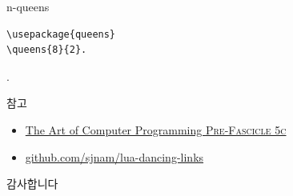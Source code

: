 \documentclass{beamer}
\begin{document}
%
\begin{frame}[fragile]{n-queens}
\begin{verbatim}
\usepackage{queens}
\queens{8}{2}.
\end{verbatim}
\vspace{-10mm}
.
\end{frame}

%
\begin{frame}{참고}
  \begin{itemize}
  \item \href{http://www-cs-faculty.stanford.edu/~knuth/fasc5c.ps.gz}
    {The Art of Computer Programming \textsc{Pre-Fascicle 5c}}
  \item \href{https://github.com/sjnam/lua-dancing-links}
    {github.com/sjnam/lua-dancing-links}
  \end{itemize}
\end{frame}


%
\begin{frame}[standout]
  감사합니다
\end{frame}
\end{document}
